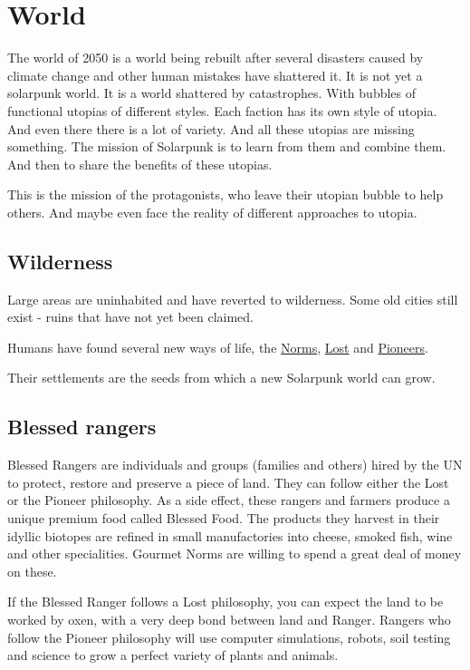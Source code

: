 \chapter{World}

The world of 2050 is a world being rebuilt after several disasters caused by climate change and other human mistakes have shattered it. It is not yet a solarpunk world. It is a world shattered by catastrophes. With bubbles of functional utopias of different styles.
Each faction has its own style of utopia. And even there there is a lot of variety.
And all these utopias are missing something. The mission of Solarpunk is to learn from them and combine them. And then to share the benefits of these utopias.

This is the mission of the protagonists, who leave their utopian bubble to help others. And maybe even face the reality of different approaches to utopia.

\section{Wilderness}

Large areas are uninhabited and have reverted to wilderness. Some old cities still exist - ruins that have not yet been claimed.

Humans have found several new ways of life, the \hyperref[sec:Norms]{Norms}, \hyperref[sec:Lost]{Lost} and \hyperref[sec:Pioneers]{Pioneers}.

Their settlements are the seeds from which a new Solarpunk world can grow.

\section{Blessed rangers}
\label{sec:Blessed Rangers}
\label{sec:Blessed Food}

Blessed Rangers are individuals and groups (families and others) hired by the UN to protect, restore and preserve a piece of land. They can follow either the Lost or the Pioneer philosophy. As a side effect, these rangers and farmers produce a unique premium food called Blessed Food. The products they harvest in their idyllic biotopes are refined in small manufactories into cheese, smoked fish, wine and other specialities.
Gourmet Norms are willing to spend a great deal of money on these.

If the Blessed Ranger follows a Lost philosophy, you can expect the land to be worked by oxen, with a very deep bond between land and Ranger. Rangers who follow the Pioneer philosophy will use computer simulations, robots, soil testing and science to grow a perfect variety of plants and animals.

